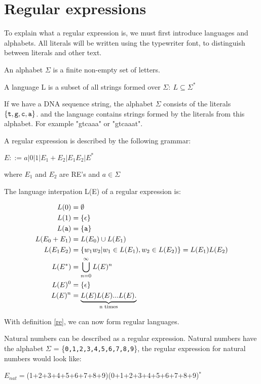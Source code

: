 \section{Regular expressions} 
  To explain what a regular expression is, we must first introduce languages and alphabets. All literals will be written using the typewriter font, to distinguish between literals and other text. 
\begin{mydef}\label{alph}
An alphabet $\Sigma$ is a finite non-empty set of letters.
\end{mydef}

\begin{mydef}\label{lang}
A language L is a subset of all strings formed over $\Sigma:~ L\subseteq \Sigma^*$
\end{mydef}

\begin{myex}
If we have a DNA sequence string, the alphabet $\Sigma$ consists of the literals ${\tt\{t,g,c,a\}}$. and the language contains strings formed by the literals from this alphabet. For example "gtcaaa" or "gtcaaat". 
\end{myex}


\begin{mydef}
A regular expression is described by the following grammar: \\
\begin{center}
$E::= a|0|1|E_1 + E_2 |E_1 E_2 | E^*$
\end{center}
where $E_1$ and $E_2$ are RE's and $a \in \Sigma$
\end{mydef}

\begin{mydef}\label{re}
The language interpation L(E) of a regular expression is: 
\begin{center}
\begin{align*}
L(0)           &= \emptyset\\
L(1)         &= \{\epsilon\} \\
L({\tt a})     &= \{{\tt a}\} \\
L(E_0 + E_1) &= L(E_0) \cup L(E_1) \\
L(E_1 E_2)   &= \{w_1w_2 | w_1 \in L(E_1),w_2 \in L(E_2)\}=L(E_1)L(E_2) \\
L(E^*)       &= \bigcup\limits_{n=0}^\infty L(E)^n \\
L(E)^0       &= \{\epsilon\}\\
L(E)^n       &= \underbrace{L(E)L(E)...L(E).}_\text{n times}
\end{align*}
\end{center}
\cite[p.5 def. 3]{crash}
\end{mydef}

With definition \ref{re}, we can now form regular languages. 
\begin{myex}Natural numbers can be described as a regular expression. Natural numbers have the alphabet $\Sigma$ = \{{\tt 0,1,2,3,4,5,6,7,8,9}\}, the regular expression for natural numbers would look like:
\begin{center}
$E_{nat} = $(1+2+3+4+5+6+7+8+9)(0+1+2+3+4+5+6+7+8+9)$^*$
\end{center}
\end{myex}
